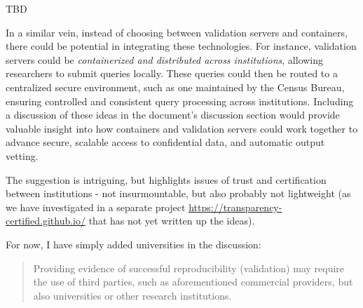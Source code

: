 \begin{response}
    TBD
\end{response}

\begin{referee}


    In a similar vein, instead of choosing between validation servers and containers, there could be potential in integrating these technologies.  For instance, validation servers could be \textit{containerized and distributed across institutions}, allowing researchers to submit queries locally.  These queries could then be routed to a centralized secure environment, such as one maintained by the Census Bureau, ensuring controlled and consistent query processing across institutions.
    Including a discussion of these ideas in the document's discussion section would provide valuable insight into how containers and validation servers could work together to advance secure, scalable access to confidential data, and automatic output vetting.
\end{referee}

\begin{response}
    The suggestion is intriguing, but highlights issues of trust and certification between institutions - not insurmountable, but also probably not lightweight (as we have investigated in a separate project \url{https://transparency-certified.github.io/} that has not yet written up the ideas).

    For now, I have simply added universities in the discussion:

    \begin{quote}
        Providing evidence of successful reproducibility (validation) may require the use of third parties, such as aforementioned commercial providers, but also universities or other research institutions. 
    \end{quote}
\end{response}

